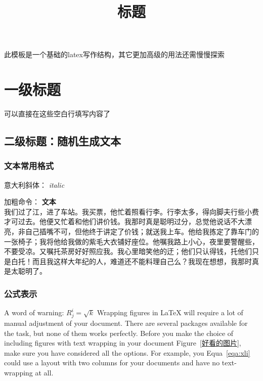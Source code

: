 \documentclass[UTF8]{ctexart}
\title{标题}
\date{ }  %
\begin{document}
\maketitle

此模板是一个基础的latex写作结构，其它更加高级的用法还需慢慢探索

\section{一级标题}

可以直接在这些空白行填写内容了

\subsection{二级标题：随机生成文本}

\lipsum[1-2] %

\subsubsection{文本常用格式}

意大利斜体： \textit{italic}

加粗命令： \textbf{文本}\\ %

我们过了江，进了车站。我买票，他忙着照看行李。行李太多，得向脚夫行些小费才可过去。他便又忙着和他们讲价钱。我那时真是聪明过分，总觉他说话不大漂亮，非自己插嘴不可，但他终于讲定了价钱；就送我上车。他给我拣定了靠车门的一张椅子；我将他给我做的紫毛大衣铺好座位。他嘱我路上小心，夜里要警醒些，不要受凉。又嘱托茶房好好照应我。我心里暗笑他的迂；他们只认得钱，托他们只是白托！而且我这样大年纪的人，难道还不能料理自己么？我现在想想，我那时真是太聪明了。

\subsubsection{公式表示}

A word of warning: $R^{i}_{j}=\sqrt{k}$ Wrapping figures in LaTeX will require a lot of manual adjustment of your document. There are several packages available for the task, but none of them works perfectly. Before you make the choice of including figures with text wrapping in your document Figure~\ref{好看的图片}, make sure you have considered all the options. For example, you Equa~\ref{eqa:xli} could use a layout with two columns for your documents and have no text-wrapping at all.
\end{document}

